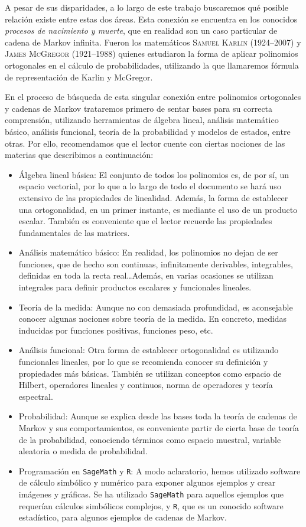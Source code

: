 A pesar de sus disparidades, a lo largo de este trabajo buscaremos qué posible relación existe entre estas dos áreas. Esta conexión se encuentra en los conocidos \textit{procesos de nacimiento y muerte}, que en realidad son un caso particular de cadena de Markov infinita. Fueron los matemáticos \textsc{Samuel Karlin} (1924--2007) y \textsc{James McGregor} (1921--1988) quienes estudiaron la forma de aplicar polinomios ortogonales en el cálculo de probabilidades, utilizando la que llamaremos fórmula de representación de Karlin y McGregor.

En el proceso de búsqueda de esta singular conexión entre polinomios ortogonales y cadenas de Markov trataremos primero de sentar bases para su correcta comprensión, utilizando herramientas de álgebra lineal, análisis matemático básico, análisis funcional, teoría de la probabilidad y modelos de estados, entre otras. Por ello, recomendamos que el lector cuente con ciertas nociones de las materias que describimos a continuación:
\begin{itemize}
    \item Álgebra lineal básica: El conjunto de todos los polinomios es, de por sí, un espacio vectorial, por lo que a lo largo de todo el documento se hará uso extensivo de las propiedades de linealidad. Además, la forma de establecer una ortogonalidad, en un primer instante, es mediante el uso de un producto escalar. También es conveniente que el lector recuerde las propiedades fundamentales de las matrices.
    \item Análisis matemático básico: En realidad, los polinomios no dejan de ser funciones, que de hecho son continuas, infinitamente derivables, integrables, definidas en toda la recta real\dots Además, en varias ocasiones se utilizan integrales para definir productos escalares y funcionales lineales.
    \item Teoría de la medida: Aunque no con demasiada profundidad, es aconsejable conocer algunas nociones sobre teoría de la medida. En concreto, medidas inducidas por funciones positivas, funciones peso, etc.
    \item Análisis funcional: Otra forma de establecer ortogonalidad es utilizando funcionales lineales, por lo que se recomienda conocer su definición y propiedades más básicas. También se utilizan conceptos como espacio de Hilbert, operadores lineales y continuos, norma de operadores y teoría espectral.
    \item Probabilidad: Aunque se explica desde las bases toda la teoría de cadenas de Markov y sus comportamientos, es conveniente partir de cierta base de teoría de la probabilidad, conociendo términos como espacio muestral, variable aleatoria o medida de probabilidad.
    \item Programación en \texttt{SageMath} y \texttt{R}: A modo aclaratorio, hemos utilizado software de cálculo simbólico y numérico para exponer algunos ejemplos y crear imágenes y gráficas. Se ha utilizado \texttt{SageMath} para aquellos ejemplos que requerían cálculos simbólicos complejos, y \texttt{R}, que es un conocido software estadístico, para algunos ejemplos de cadenas de Markov.
\end{itemize}

